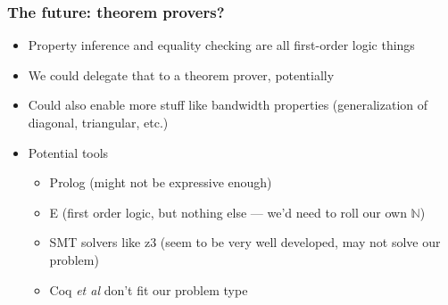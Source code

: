 \documentclass{beamer}
\begin{document}
\begin{frame}
  \frametitle{The future: theorem provers?}
  \begin{itemize}
  \item Property inference and equality checking are all first-order logic things
  \item We could delegate that to a theorem prover, potentially
  \item Could also enable more stuff like bandwidth properties (generalization of diagonal, triangular, etc.)
  \item Potential tools
    \begin{itemize}
    \item Prolog (might not be expressive enough)
    \item E (first order logic, but nothing else --- we'd need to roll our own $\mathbb{N}$)
    \item SMT solvers like z3 (seem to be very well developed, may not solve our problem)
    \item Coq \emph{et al} don't fit our problem type
    \end{itemize}
  \end{itemize}
\end{frame}
\end{document}
